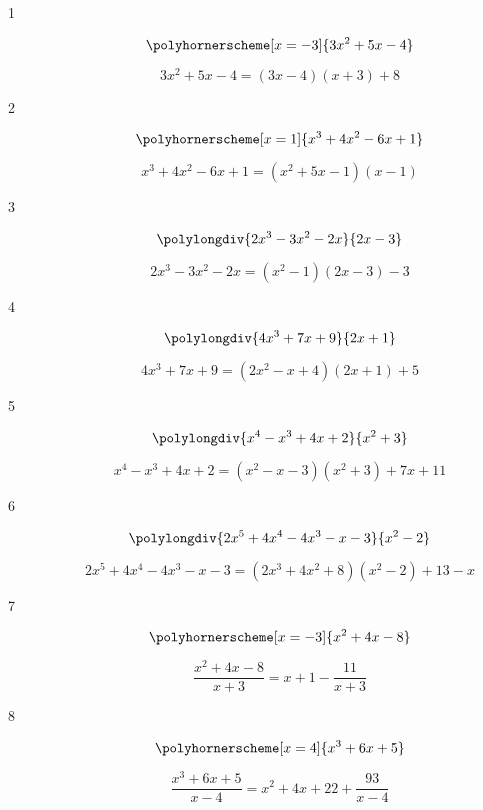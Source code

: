 \documentclass{exam}
\begin{document}
    \begin{description}

      \item[1]
        \[
          \polyhornerscheme[x = -3]{3x^2 + 5x - 4}
        \]

        \[
          3x^2 + 5x - 4 = \boxed{(3x - 4)(x + 3) + 8}
        \]

      \item[2] 
        \[
          \polyhornerscheme[x = 1]{x^3 + 4x^2 - 6x + 1}
        \]

        \[
          x^3 + 4x^2 - 6x + 1 = \boxed{\left( x^2 + 5x - 1 \right)(x - 1)}
        \]

      \item[3] 
        \[
          \polylongdiv{2x^3 - 3x^2 - 2x}{2x - 3}
        \]

        \[
          2x^3 - 3x^2 - 2x = \boxed{\left( x^2 - 1 \right) (2 x - 3) - 3}
        \]

      \item[4] 
        \[
          \polylongdiv{4x^3 + 7x + 9}{2x + 1}
        \]

        \[
          4x^3 + 7x + 9 = \boxed{\left( 2x^2 - x + 4 \right) (2 x + 1) + 5}
        \]

      \item[5] 
        \[
          \polylongdiv{x^4 - x^3 + 4x + 2}{x^2 + 3}
        \]

        \[
          x^4 - x^3 + 4x + 2 = \boxed{\left( x^2 - x - 3 \right) (x^2 + 3) + 7x + 11}
        \]

      \pagebreak

      \item[6] 
        \[
          \polylongdiv{2x^5 + 4x^4 - 4x^3 - x - 3}{x^2 - 2}
        \]

        \[
          2x^5 + 4x^4 - 4x^3 - x - 3 = \boxed{\left( 2x^3 + 4x^2 + 8 \right)(x^2 - 2) + 13 - x}
        \]

      \item[7] 
        \[
          \polyhornerscheme[x = -3]{x^2 + 4x - 8}
        \]

        \[
          \frac{x^2 + 4x - 8}{x + 3} = \boxed{x + 1 - \frac{11}{x + 3}}
        \]

      \item[8] 
        \[
          \polyhornerscheme[x = 4]{x^3 + 6x + 5}
        \]

        \[
          \frac{x^3 + 6x + 5}{x - 4} = \boxed{x^2 + 4x + 22 + \frac{93}{x - 4}}
        \]


\end{description}
\end{document}
